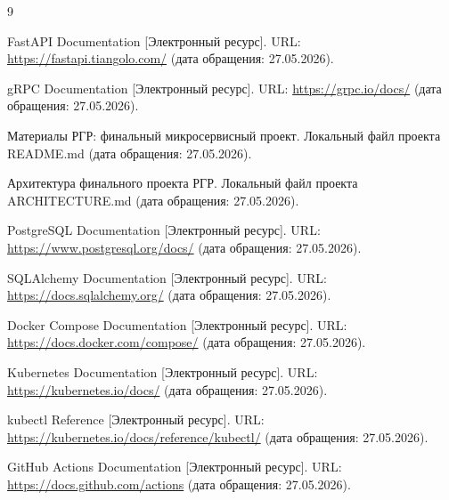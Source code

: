 \begin{thebibliography}{9}

FastAPI Documentation [Электронный ресурс]. URL: \url{https://fastapi.tiangolo.com/}
(дата обращения: 27.05.2026).

gRPC Documentation [Электронный ресурс]. URL: \url{https://grpc.io/docs/}
(дата обращения: 27.05.2026).

Материалы РГР: финальный микросервисный проект. Локальный файл проекта README.md
(дата обращения: 27.05.2026).

Архитектура финального проекта РГР. Локальный файл проекта ARCHITECTURE.md
(дата обращения: 27.05.2026).

PostgreSQL Documentation [Электронный ресурс]. URL: \url{https://www.postgresql.org/docs/}
(дата обращения: 27.05.2026).

SQLAlchemy Documentation [Электронный ресурс]. URL: \url{https://docs.sqlalchemy.org/}
(дата обращения: 27.05.2026).

Docker Compose Documentation [Электронный ресурс]. URL: \url{https://docs.docker.com/compose/}
(дата обращения: 27.05.2026).

Kubernetes Documentation [Электронный ресурс]. URL: \url{https://kubernetes.io/docs/}
(дата обращения: 27.05.2026).

kubectl Reference [Электронный ресурс]. URL: \url{https://kubernetes.io/docs/reference/kubectl/}
(дата обращения: 27.05.2026).

GitHub Actions Documentation [Электронный ресурс]. URL: \url{https://docs.github.com/actions}
(дата обращения: 27.05.2026).

\end{thebibliography}
